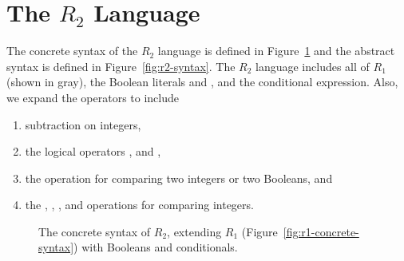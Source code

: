 \documentclass[11pt]{book}
\newcommand{\gray}[1]{{\color{lightgray} #1}}
\begin{document}
\section{The $R_2$ Language}
\label{sec:r2-lang}

The concrete syntax of the $R_2$ language is defined in
Figure~\ref{fig:r2-concrete-syntax} and the abstract syntax is defined
in Figure~\ref{fig:r2-syntax}. The $R_2$ language includes all of
$R_1$ (shown in gray), the Boolean literals  and ,
and the conditional  expression. Also, we expand the
operators to include
\begin{enumerate}
\item subtraction on integers,
\item the logical operators ,  and ,
\item the  operation for comparing two integers or two Booleans, and
\item the \key{<}, \key{<=}, \key{>}, and \key{>=} operations for
  comparing integers.
\end{enumerate}

\begin{figure}[tp]
\centering
\fbox{
\begin{minipage}{0.96\textwidth}
\[
\begin{array}{lcl}
  \itm{bool} &::=& \key{\#t} \mid \key{\#f} \\  
  \itm{cmp} &::= & \key{eq?} \mid \key{<} \mid \key{<=} \mid \key{>} \mid \key{>=} \\
  \Exp &::=& \gray{ \Int \mid (\key{read}) \mid (\key{-}\;\Exp) \mid (\key{+} \; \Exp\;\Exp) }  \mid (\key{-}\;\Exp\;\Exp) \\
     &\mid&  \gray{ \Var \mid (\key{let}~([\Var~\Exp])~\Exp) } \\
     &\mid& \itm{bool}
      \mid (\key{and}\;\Exp\;\Exp) \mid (\key{or}\;\Exp\;\Exp)
      \mid (\key{not}\;\Exp) \\
      &\mid& (\itm{cmp}\;\Exp\;\Exp) \mid (\key{if}~\Exp~\Exp~\Exp) \\
  R_2 &::=& \Exp
\end{array}
\]
\end{minipage}
}
\caption{The concrete syntax of $R_2$, extending $R_1$
  (Figure~\ref{fig:r1-concrete-syntax}) with Booleans and conditionals.}
\label{fig:r2-concrete-syntax}
\end{figure}
\end{document}
